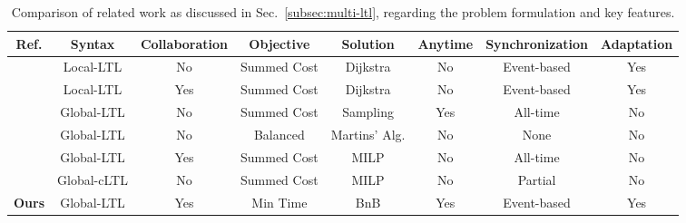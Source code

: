 \begin{table*}[t]
  \begin{center}
    \caption{Comparison of related work as discussed in Sec.~\ref{subsec:multi-ltl},
  regarding the problem formulation and key features.}
\label{table:compare}
\begin{adjustbox}{width=0.9\linewidth}
{\def\arraystretch{1.2}\tabcolsep=3pt
\begin{tabular}{cccccccc}
\toprule
Ref. & Syntax & Collaboration & Objective  & Solution & Anytime & Synchronization & Adaptation \\ \midrule
\citep{guo2015multi, tumova2016multi} & Local-LTL & No & Summed Cost & Dijkstra & No & Event-based  & Yes\\
\citep{guo2016task} & Local-LTL & Yes & Summed Cost & Dijkstra &  No & Event-based  & Yes \\
\citep{kantaros2020stylus, luo2021abstraction} & Global-LTL & No & Summed Cost & Sampling & Yes & All-time & No \\
\citep{schillinger2018simultaneous} & Global-LTL & No & Balanced & Martins' Alg.  & No & None & No \\
\citep{luo2021temporal} & Global-LTL & Yes & Summed Cost & MILP & No & All-time & No \\
\citep{sahin2019multirobot, jones2019scratchs} & Global-cLTL & No & Summed Cost & MILP & No & Partial & No \\
\textbf{Ours} & Global-LTL & Yes & Min Time & BnB & Yes & Event-based & Yes \\
\bottomrule
\end{tabular}%
}
\end{adjustbox}
\end{center}
\end{table*}

